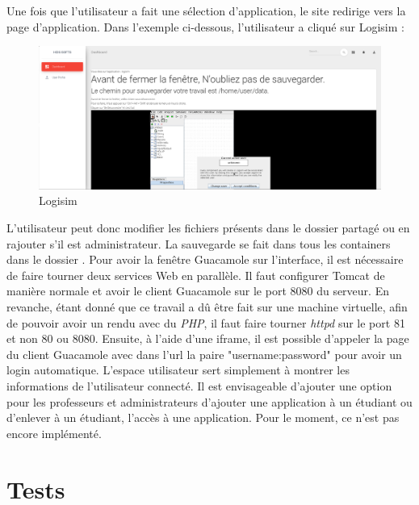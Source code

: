 Une fois que l'utilisateur a fait une sélection d'application, le site redirige vers la page d'application.
Dans l'exemple ci-dessous, l'utilisateur a cliqué sur Logisim : 
\begin{figure}[H]
	\centering
	\includegraphics[scale=0.2]{images/website_logisim.png}
	\caption{Logisim}
	\label{fig:website_logisim}
\end{figure}
L'utilisateur peut donc modifier les fichiers présents dans le dossier partagé ou en rajouter s'il est administrateur.
La sauvegarde se fait dans tous les containers dans le dossier .
\newline
Pour avoir la fenêtre Guacamole sur l'interface, il est nécessaire de faire tourner deux services Web en parallèle.
Il faut configurer Tomcat de manière normale et avoir le client Guacamole sur le port 8080 du serveur.
En revanche, étant donné que ce travail a dû être fait sur une machine virtuelle,
afin de pouvoir avoir un rendu avec du \textit{PHP}, il faut faire tourner \textit{httpd} sur le port 81 et non 80 ou 8080.
Ensuite, à l'aide d'une iframe, il est possible d'appeler la page du client Guacamole avec dans l'url la paire "username:password" pour avoir un login automatique.
\newline
L'espace utilisateur sert simplement à montrer les informations de l'utilisateur connecté.
Il est envisageable d'ajouter une option pour les professeurs et administrateurs d'ajouter une application à un étudiant ou d'enlever à un étudiant, l'accès à une application.
Pour le moment, ce n'est pas encore implémenté.

\section{Tests}

